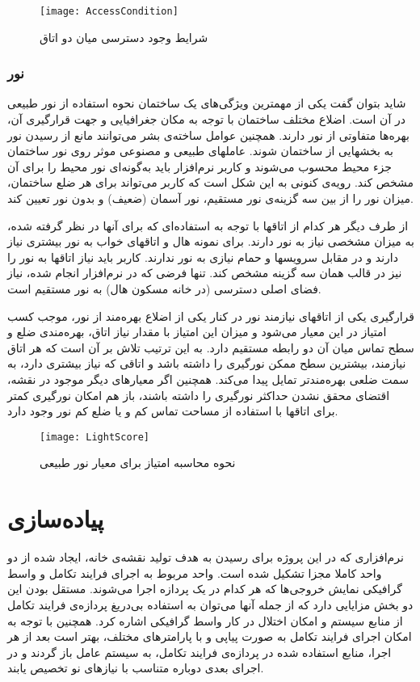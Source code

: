 \documentclass{report}
\begin{document}
\begin{figure} \centerline{\texttt{[image: AccessCondition]}} \caption{\label{fAccessCondition}
شرایط وجود دسترسی میان دو اتاق
 } \end{figure}

\subsubsection{نور}
شاید بتوان گفت یکی از مهمترین ویژگی‌های یک ساختمان نحوه استفاده از نور طبیعی در آن است. اضلاع مختلف ساختمان با توجه به مکان جغرافیایی و جهت قرارگیری آن، بهره‌ها متفاوتی از نور دارند. همچنین عوامل ساخته‌ی بشر می‌توانند مانع از رسیدن نور به بخشهایی از ساختمان شوند. عاملهای طبیعی و مصنوعی موثر روی نور ساختمان جزء محیط محسوب می‌شوند و کاربر نرم‌افزار باید به‌گونه‌ای نور محیط را برای آن مشخص کند. رویه‌ی کنونی به این شکل است که کاربر می‌تواند برای هر ضلع ساختمان، میزان نور را از بین سه گزینه‌ی نور مستقیم، نور آسمان (ضعیف) و بدون نور تعیین کند.

از طرف دیگر هر کدام از اتاقها با توجه به استفاده‌ای که برای آنها در نظر گرفته شده، به میزان مشخصی نیاز به نور دارند. برای نمونه هال و اتاقهای خواب به نور بیشتری نیاز دارند و در مقابل سرویسها و حمام نیازی به نور ندارند. کاربر باید نیاز اتاقها به نور را نیز در قالب همان سه گزینه مشخص کند. تنها فرضی که در نرم‌افزار انجام شده، نیاز فضای اصلی دسترسی (در خانه مسکون هال) به نور مستقیم است.

قرارگیری یکی از اتاقهای نیازمند نور در کنار یکی از اضلاع بهره‌مند از نور، موجب کسب امتیاز در این معیار می‌شود و میزان این امتیاز با مقدار نیاز اتاق، بهره‌مندی ضلع و سطح تماس میان آن دو رابطه مستقیم دارد. به این ترتیب تلاش بر آن است که هر اتاق نیازمند، بیشترین سطح ممکن نورگیری را داشته باشد و اتاقی که نیاز بیشتری دارد، به سمت ضلعی بهره‌مندتر تمایل پیدا می‌کند. همچنین اگر معیارهای دیگر موجود در نقشه، اقتضای محقق نشدن حداکثر نورگیری را داشته باشند، باز هم امکان نورگیری کمتر برای اتاقها با استفاده از مساحت تماس کم و یا ضلع کم نور وجود دارد.

\begin{figure} \centerline{\texttt{[image: LightScore]}} \caption{\label{fLightScore}
نحوه محاسبه امتیاز برای معیار نور طبیعی
 } \end{figure}

\section{پیاده‌سازی}
نرم‌افزاری که در این پروژه برای رسیدن به هدف تولید نقشه‌ی خانه، ایجاد شده از دو واحد کاملا مجزا تشکیل شده است. واحد مربوط به اجرای فرایند تکامل و واسط گرافیکی نمایش خروجی‌ها که هر کدام در یک پردازه اجرا می‌شوند. مستقل بودن این دو بخش مزایایی دارد که از جمله آنها می‌توان به استفاده بی‌دریغ پردازه‌ی فرایند تکامل از منابع سیستم و امکان اختلال در کار واسط گرافیکی اشاره کرد. همچنین با توجه به امکان اجرای فرایند تکامل به صورت پیاپی و با پارامترهای مختلف، بهتر است بعد از هر اجرا، منابع استفاده شده در پردازه‌ی فرایند تکامل، به سیستم عامل باز گردند و در اجرای بعدی دوباره متناسب با نیازهای نو تخصیص یابند.
\end{document}
